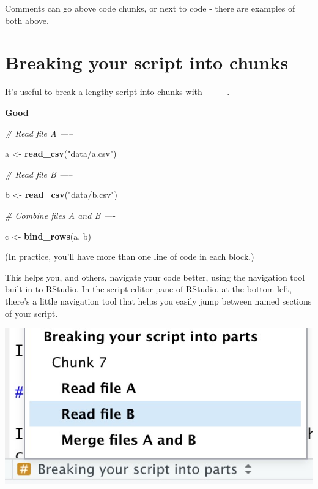\documentclass[]{book}
\newenvironment{Shaded}{\begin{snugshade}}{\end{snugshade}}
\newcommand{\CommentTok}[1]{\textcolor[rgb]{0.56,0.35,0.01}{\textit{#1}}}
\newcommand{\KeywordTok}[1]{\textcolor[rgb]{0.13,0.29,0.53}{\textbf{#1}}}
\newcommand{\NormalTok}[1]{#1}
\newcommand{\StringTok}[1]{\textcolor[rgb]{0.31,0.60,0.02}{#1}}
\begin{document}
Comments can go above code chunks, or next to code - there are examples of both above.

\hypertarget{breaking-your-script-into-chunks}{%
\section{Breaking your script into chunks}\label{breaking-your-script-into-chunks}}

It's useful to break a lengthy script into chunks with \texttt{-\/-\/-\/-\/-}.

\textbf{Good}

\begin{Shaded}
\begin{Highlighting}[]
\CommentTok{# Read file A -----}

\NormalTok{a <-}\StringTok{ }\KeywordTok{read_csv}\NormalTok{(}\StringTok{"data/a.csv"}\NormalTok{)}

\CommentTok{# Read file B -----}

\NormalTok{b <-}\StringTok{ }\KeywordTok{read_csv}\NormalTok{(}\StringTok{"data/b.csv"}\NormalTok{)}

\CommentTok{# Combine files A and B ----}

\NormalTok{c <-}\StringTok{ }\KeywordTok{bind_rows}\NormalTok{(a, b)}
\end{Highlighting}
\end{Shaded}

(In practice, you'll have more than one line of code in each block.)

This helps you, and others, navigate your code better, using the navigation tool built in to RStudio. In the script editor pane of RStudio, at the bottom left, there's a little navigation tool that helps you easily jump between named sections of your script.

\includegraphics[width=7.64in]{atlas/rstudio_navigation}
\end{document}
